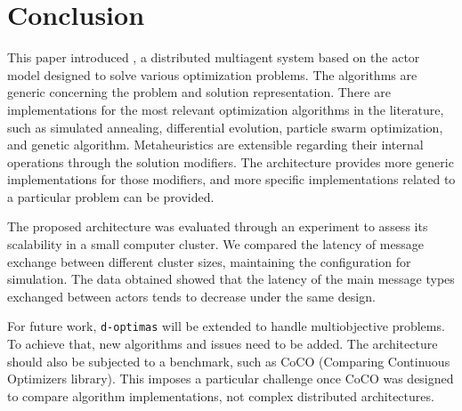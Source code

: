 \documentclass[preprint,12pt]{elsarticle}
\begin{document}
\section{Conclusion}
\label{sec:conclusion}

This paper introduced , a distributed multiagent system based on the actor model designed to solve various optimization problems. The algorithms are generic concerning the problem and solution representation. There are implementations for the most relevant optimization algorithms in the literature, such as simulated annealing, differential evolution, particle swarm optimization, and genetic algorithm. Metaheuristics are extensible regarding their internal operations through the solution modifiers. The architecture provides more generic implementations for those modifiers, and more specific implementations related to a particular problem can be provided.

The proposed architecture was evaluated through an experiment to assess its scalability in a small computer cluster. We compared the latency of message exchange between different cluster sizes, maintaining the configuration for simulation. The data obtained showed that the latency of the main message types exchanged between actors tends to decrease under the same design. 

For future work, \texttt{d-optimas} will be extended to handle multiobjective problems. To achieve that, new algorithms and issues need to be added. The architecture should also be subjected to a benchmark, such as CoCO (Comparing Continuous Optimizers library)\cite{hansen2021}. This imposes a particular challenge once CoCO was designed to compare algorithm implementations, not complex distributed architectures.

  
 
\end{document}
